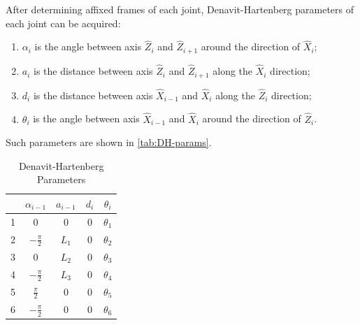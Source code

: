 \documentclass{article}
\begin{document}
After determining affixed frames of each joint, Denavit-Hartenberg parameters of each joint can be acquired:
\begin{enumerate}
    \item $\alpha_i$ is the angle between axis $\hat Z_i$ and $\hat Z_{i+1}$ around the direction of $\hat X_i$;
    \item $a_i$ is the distance between axis $\hat Z_i$ and $\hat Z_{i+1}$ along the $\hat X_i$ direction;
    \item $d_i$ is the distance between axis $\hat X_{i-1}$ and $\hat X_i$ along the $\hat Z_i$ direction;
    \item $\theta_i$ is the angle between axis $\hat X_{i-1}$ and $\hat X_i$ around the direction of $\hat Z_i$.
\end{enumerate}
Such parameters are shown in \autoref{tab:DH-params}.

\begin{table}[ht]
    \caption{Denavit-Hartenberg Parameters}
    \label{tab:DH-params}
    \centering
    \begin{tabular}{c|cccc}
        \hline
        & $\alpha_{i-1}$ & $a_{i-1}$ & $d_i$ & $\theta_i$ \\
        \hline
        1 & $0$ & $0$ & $0$ & $\theta_1$ \\
        2 & $-\frac{\pi}{2}$ & $L_1$ & $0$ & $\theta_2$ \\
        3 & $0$ & $L_2$ & $0$ & $\theta_3$ \\
        4 & $-\frac{\pi}{2}$ & $L_3$ & $0$ & $\theta_4$\\
        5 & $\frac{\pi}{2}$ & $0$ & $0$ & $\theta_5$\\
        6 & $-\frac{\pi}{2}$ & $0$ & $0$ & $\theta_6$\\ \hline
    \end{tabular}
\end{table}
\end{document}
